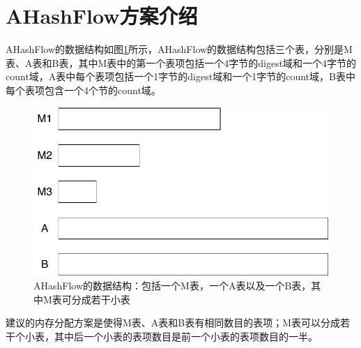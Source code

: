 \documentclass{article}
\begin{document}
\section{AHashFlow方案介绍}
AHashFlow的数据结构如图\ref{fig:ahashflow}所示，AHashFlow的数据结构包括三个表，分别是M表、A表和B表，其中M表中的第一个表项包括一个4字节的digest域和一个4字节的count域，A表中每个表项包括一个1字节的digest域和一个1字节的count域，B表中每个表项包含一个4个节的count域。
\begin{figure}[ht!]
	\centering
	\includegraphics[width=0.7\linewidth]{./figures/AHashFlowDataStructure/AHashFlow}
	\caption{AHashFlow的数据结构：包括一个M表，一个A表以及一个B表，其中M表可分成若干小表}
	\label{fig:ahashflow}
\end{figure}

建议的内存分配方案是使得M表、A表和B表有相同数目的表项；M表可以分成若干个小表，其中后一个小表的表项数目是前一个小表的表项数目的一半。



\begin{algorithm}[ht!]
	\caption{$promote(idx, digest, cnt)$}
	\label{alg: promote}
	\begin{algorithmic}[1]
	\end{algorithmic}
\end{algorithm}
\end{document}
